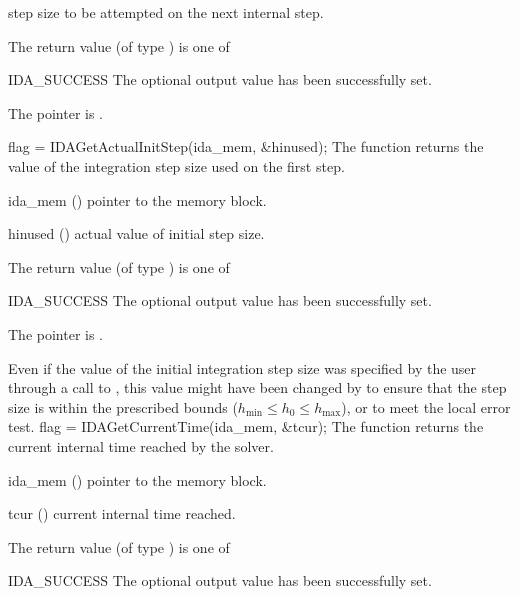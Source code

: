 {{\begin{args}
    step size to be attempted on the next internal step.
  \end{args}
}
{
  The return value  (of type ) is one of
  \begin{args}
  \item[IDA\_SUCCESS] 
    The optional output value has been successfully set.
  \item[\Id{IDA\_MEM\_NULL}]
    The  pointer is .
  \end{args}
}
{}
{
  flag = IDAGetActualInitStep(ida\_mem, \&hinused);
}
{
  The function  returns the
  value of the integration step size used on the first step.
}
{
  \begin{args}
  \item[ida\_mem] ()
    pointer to the {\idas} memory block.
  \item[hinused] ()
    actual value of initial step size.
  \end{args}
}
{
  The return value  (of type ) is one of
  \begin{args}
  \item[IDA\_SUCCESS] 
    The optional output value has been successfully set.
  \item[\Id{IDA\_MEM\_NULL}]
    The  pointer is .
  \end{args}
}
{
  Even if the value of the initial integration step size was specified
  by the user through a call to , this value might have 
  been changed by {\idas} to ensure that the step size is within the 
  prescribed bounds ($h_{\min} \le h_0 \le h_{\max}$), or to meet the
  local error test.
}
{
  flag = IDAGetCurrentTime(ida\_mem, \&tcur);
}
{
  The function  returns the
  current internal time reached by the solver.
}
{
  \begin{args}
  \item[ida\_mem] ()
    pointer to the {\idas} memory block.
  \item[tcur] ()
    current internal time reached.
  \end{args}
}
{
  The return value  (of type ) is one of
  \begin{args}
  \item[IDA\_SUCCESS] 
    The optional output value has been successfully set.

\end{args}}}
